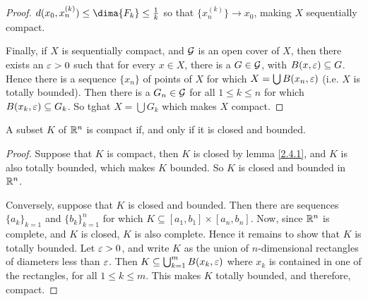 \begin{proof}
    $d(x_0,x_n^{(k)}) \leq \dima{F_k} \leq \frac{1}{k}$ so that $\{x_n^{(k)}\}
    \xrightarrow{} x_0$, making $X$ sequentially compact.

    Finally, if  $X$ is sequentially compact, and  $\mathcal{G}$ is an open cover of
    $X$, then there exists an  $\varepsilon>0$ such that for every  $x \in X$, there is a
     $G \in \mathcal{G}$, with  $B(x,\varepsilon) \subseteq G$. Hence there is a sequence
     $\{x_n\}$ of points of $X$ for which  $X=\bigcup{B(x_n,\varepsilon)}$ (i.e. $X$ is
     totally bounded). Then there is a $G_n \in \mathcal{G}$ for all  $1 \leq k \leq n$
     for which  $B(x_k,\varepsilon) \subseteq G_k$. So tghat $X=\bigcup{G_k}$ which makes
     $X$ compact.
\end{proof}

\begin{theorem}\label{2.4.5}
    A subset $K$ of  $\mathbb{R}^n$ is compact if, and only if it is closed and bounded.
\end{theorem}
\begin{proof}
    Suppose that $K$ is compact, then  $K$ is closed by lemma \ref{2.4.1}, and
    $K$ is also totally bounded, which makes  $K$ bounded. So $K$ is closed and
    bounded in  $\mathbb{R}^n$.

    Conversely, suppose that $K$ is closed and bounded. Then there are sequences
     $\{a_k\}_{k=1}$ and $\{b_k\}_{k=1}^n$ for which $K \subseteq [a_1,b_1]
     \times [a_n,b_n]$. Now, since $\mathbb{R}^n$ is complete, and  $K$ is closed,  $K$
     is also complete. Hence it remains to show that $K$ is totally bounded. Let
     $\varepsilon>0$, and write $K$ as the union of $n$-dimensional rectangles of
     diameters less than  $\varepsilon$. Then  $K \subseteq \bigcup_{k=1}^m{B(x_k,\varepsilon)}$
     where $x_k$ is contained in one of the rectangles, for all  $1 \leq k \leq
     m$. This makes $K$ totally bounded, and therefore, compact.
\end{proof}
